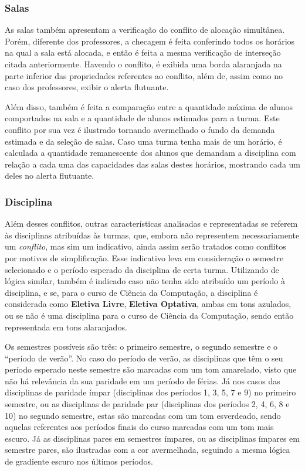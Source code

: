 \subsubsection{Salas}

As salas também apresentam a verificação do conflito de alocação simultânea. Porém, diferente dos professores, a checagem é feita conferindo todos os horários na qual a sala está alocada, e então é feita a mesma verificação de interseção citada anteriormente. Havendo o conflito, é exibida uma borda alaranjada na parte inferior das propriedades referentes ao conflito, além de, assim como no caso dos professores, exibir o alerta flutuante.

Além disso, também é feita a comparação entre a quantidade máxima de alunos comportados na sala e a quantidade de alunos estimados para a turma. Este conflito por sua vez é ilustrado tornando avermelhado o fundo da demanda estimada e da seleção de salas. Caso uma turma tenha mais de um horário, é calculada a quantidade remanescente dos alunos que demandam a disciplina com relação a cada uma das capacidades das salas destes horários, mostrando cada um deles no alerta flutuante.

\subsubsection{Disciplina}

Além desses conflitos, outras características analisadas e representadas se referem às disciplinas atribuídas às turmas, que, embora não representem necessariamente um \textit{conflito}, mas sim um indicativo, ainda assim serão tratados como conflitos por motivos de simplificação. Esse indicativo leva em consideração o semestre selecionado e o período esperado da disciplina de certa turma. Utilizando de lógica similar, também é indicado caso não tenha sido atribuído um período à disciplina, e se, para o curso de Ciência da Computação, a disciplina é considerada como \textbf{Eletiva Livre}, \textbf{Eletiva Optativa}, ambas em tons azulados, ou se não é uma disciplina para o curso de Ciência da Computação, sendo então representada em tons alaranjados.

Os semestres possíveis são três: o primeiro semestre, o segundo semestre e o ``período de verão''. No caso do período de verão, as disciplinas que têm o seu período esperado neste semestre são marcadas com um tom amarelado, visto que não há relevância da sua paridade em um período de férias. Já nos casos das disciplinas de paridade ímpar (disciplinas dos períodos 1, 3, 5, 7 e 9) no primeiro semestre, ou as disciplinas de paridade par (disciplinas dos períodos 2, 4, 6, 8 e 10) no segundo semestre, estas são marcadas com um tom esverdeado, sendo aquelas referentes aos períodos finais do curso marcadas com um tom mais escuro. Já as disciplinas pares em semestres ímpares, ou as disciplinas ímpares em semestre pares, são ilustradas com a cor avermelhada, seguindo a mesma lógica de gradiente escuro nos últimos períodos.
